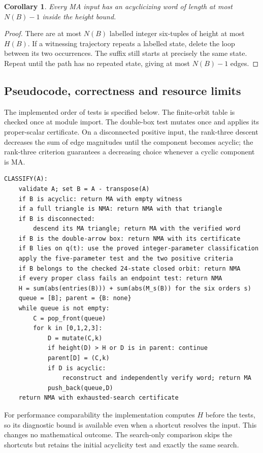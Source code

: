 \documentclass[11pt]{amsart}
\newtheorem{corollary}[theorem]{Corollary}
\theoremstyle{definition}\newtheorem{definition}[theorem]{Definition}
\theoremstyle{remark}\newtheorem{remark}[theorem]{Remark}
\begin{document}
\begin{corollary}\label{cor:wordbound}
Every MA input has an acyclicizing word of length at most $N(B)-1$ inside the height bound.
\end{corollary}
\begin{proof}
There are at most $N(B)$ labelled integer six-tuples of height at most $H(B)$. If a witnessing trajectory repeats a labelled state, delete the loop between its two occurrences. The suffix still starts at precisely the same state. Repeat until the path has no repeated state, giving at most $N(B)-1$ edges.
\end{proof}

\subsection{Pseudocode, correctness and resource limits}\label{sec:pseudocode}
The implemented order of tests is specified below. The finite-orbit table is checked once at module import. The double-box test mutates once and applies its proper-scalar certificate. On a disconnected positive input, the rank-three descent decreases the sum of edge magnitudes until the component becomes acyclic; the rank-three criterion guarantees a decreasing choice whenever a cyclic component is MA.
\begin{lstlisting}
CLASSIFY(A):
    validate A; set B = A - transpose(A)
    if B is acyclic: return MA with empty witness
    if a full triangle is NMA: return NMA with that triangle
    if B is disconnected:
        descend its MA triangle; return MA with the verified word
    if B is the double-arrow box: return NMA with its certificate
    if B lies on q(t): use the proved integer-parameter classification
    apply the five-parameter test and the two positive criteria
    if B belongs to the checked 24-state closed orbit: return NMA
    if every proper class fails an endpoint test: return NMA
    H = sum(abs(entries(B))) + sum(abs(M_s(B)) for the six orders s)
    queue = [B]; parent = {B: none}
    while queue is not empty:
        C = pop_front(queue)
        for k in [0,1,2,3]:
            D = mutate(C,k)
            if height(D) > H or D is in parent: continue
            parent[D] = (C,k)
            if D is acyclic:
                reconstruct and independently verify word; return MA
            push_back(queue,D)
    return NMA with exhausted-search certificate
\end{lstlisting}
For performance comparability the implementation computes $H$ before the tests, so its diagnostic bound is available even when a shortcut resolves the input. This changes no mathematical outcome. The search-only comparison skips the shortcuts but retains the initial acyclicity test and exactly the same search.
\end{document}
